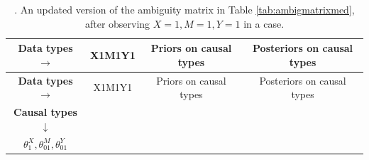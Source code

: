 \documentclass[
  12pt,
]{book}
\begin{document}
\begin{longtable}[]{@{}cccc@{}}
\caption{\label{tab:ambigmedupdate2}. An updated version of the ambiguity matrix in Table \ref{tab:ambigmatrixmed}, after observing \(X=1, M=1, Y=1\) in a case.}\tabularnewline
\toprule
\begin{minipage}[b]{0.36\columnwidth}\centering
\textbf{Data types} \(\rightarrow\)\strut
\end{minipage} & \begin{minipage}[b]{0.07\columnwidth}\centering
X1M1Y1\strut
\end{minipage} & \begin{minipage}[b]{0.21\columnwidth}\centering
Priors on causal types\strut
\end{minipage} & \begin{minipage}[b]{0.25\columnwidth}\centering
Posteriors on causal types\strut
\end{minipage}\tabularnewline
\midrule
\endfirsthead
\toprule
\begin{minipage}[b]{0.36\columnwidth}\centering
\textbf{Data types} \(\rightarrow\)\strut
\end{minipage} & \begin{minipage}[b]{0.07\columnwidth}\centering
X1M1Y1\strut
\end{minipage} & \begin{minipage}[b]{0.21\columnwidth}\centering
Priors on causal types\strut
\end{minipage} & \begin{minipage}[b]{0.25\columnwidth}\centering
Posteriors on causal types\strut
\end{minipage}\tabularnewline
\midrule
\endhead
\begin{minipage}[t]{0.36\columnwidth}\centering
\textbf{Causal types} \(\downarrow\)\strut
\end{minipage} & \begin{minipage}[t]{0.07\columnwidth}\centering
\strut
\end{minipage} & \begin{minipage}[t]{0.21\columnwidth}\centering
\strut
\end{minipage} & \begin{minipage}[t]{0.25\columnwidth}\centering
\strut
\end{minipage}\tabularnewline
\begin{minipage}[t]{0.36\columnwidth}\centering
\(\theta^X_1,\theta^M_{01},\theta^Y_{01}\)\strut
\end{minipage} & \begin{minipage}[t]{0.07\columnwidth}\centering

\end{minipage}
\end{longtable}
\end{document}
